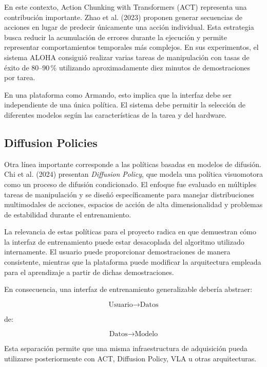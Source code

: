\documentclass[stu,12pt,floatsintext]{apa7}
\begin{document}
En este contexto, Action Chunking with Transformers (ACT) representa una contribución importante. Zhao et al. (2023) proponen generar secuencias de acciones en lugar de predecir únicamente una acción individual. Esta estrategia busca reducir la acumulación de errores durante la ejecución y permite representar comportamientos temporales más complejos. En sus experimentos, el sistema ALOHA consiguió realizar varias tareas de manipulación con tasas de éxito de 80--90\,\% utilizando aproximadamente diez minutos de demostraciones por tarea.

En una plataforma como Armando, esto implica que la interfaz debe ser independiente de una única política. El sistema debe permitir la selección de diferentes modelos según las características de la tarea y del hardware.

\subsection{Diffusion Policies}

Otra línea importante corresponde a las políticas basadas en modelos de difusión. Chi et al. (2024) presentan \textit{Diffusion Policy}, que modela una política visuomotora como un proceso de difusión condicionado. El enfoque fue evaluado en múltiples tareas de manipulación y se diseñó específicamente para manejar distribuciones multimodales de acciones, espacios de acción de alta dimensionalidad y problemas de estabilidad durante el entrenamiento.

La relevancia de estas políticas para el proyecto radica en que demuestran cómo la interfaz de entrenamiento puede estar desacoplada del algoritmo utilizado internamente. El usuario puede proporcionar demostraciones de manera consistente, mientras que la plataforma puede modificar la arquitectura empleada para el aprendizaje a partir de dichas demostraciones.

En consecuencia, una interfaz de entrenamiento generalizable debería abstraer:

\begin{equation}
\text{Usuario} \rightarrow \text{Datos}
\end{equation}

de:

\begin{equation}
\text{Datos} \rightarrow \text{Modelo}
\end{equation}

Esta separación permite que una misma infraestructura de adquisición pueda utilizarse posteriormente con ACT, Diffusion Policy, VLA u otras arquitecturas.
\end{document}
